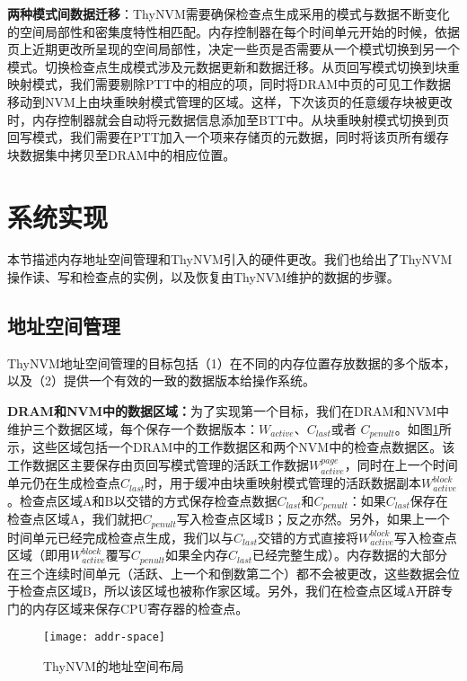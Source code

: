 \textbf{两种模式间数据迁移}：ThyNVM需要确保检查点生成采用的模式与数据不断变化的空间局部性和密集度特性相匹配。内存控制器在每个时间单元开始的时候，依据页上近期更改所呈现的空间局部性，决定一些页是否需要从一个模式切换到另一个模式。切换检查点生成模式涉及元数据更新和数据迁移。从页回写模式切换到块重映射模式，我们需要剔除PTT中的相应的项，同时将DRAM中页的可见工作数据移动到NVM上由块重映射模式管理的区域。这样，下次该页的任意缓存块被更改时，内存控制器就会自动将元数据信息添加至BTT中。从块重映射模式切换到页回写模式，我们需要在PTT加入一个项来存储页的元数据，同时将该页所有缓存块数据集中拷贝至DRAM中的相应位置。

\section{系统实现}
\label{sec:implementation}

本节描述内存地址空间管理和ThyNVM引入的硬件更改。我们也给出了ThyNVM操作读、写和检查点的实例，以及恢复由ThyNVM维护的数据的步骤。

\subsection{地址空间管理}
\label{subsec:thnvm-space}

ThyNVM地址空间管理的目标包括（1）在不同的内存位置存放数据的多个版本，以及（2）提供一个有效的一致的数据版本给操作系统。

\textbf{DRAM和NVM中的数据区域：}为了实现第一个目标，我们在DRAM和NVM中维护三个数据区域，每个保存一个数据版本：$W_{active}$、$C_{last}$或者 $C_{penult}$。如图\ref{fig-addr-space}所示，这些区域包括一个DRAM中的工作数据区和两个NVM中的检查点数据区。该工作数据区主要保存由页回写模式管理的活跃工作数据$W^{page}_{active}$，同时在上一个时间单元仍在生成检查点$C_{last}$时，用于缓冲由块重映射模式管理的活跃数据副本$W^{block}_{active}$。检查点区域A和B以交错的方式保存检查点数据$C_{last}$和$C_{penult}$：如果$C_{last}$保存在检查点区域A，我们就把$C_{penult}$写入检查点区域B；反之亦然。另外，如果上一个时间单元已经完成检查点生成，我们以与$C_{last}$交错的方式直接将$W^{block}_{active}$写入检查点区域（即用$W^{block}_{active}$覆写$C_{penult}$如果全内存$C_{last}$已经完整生成）。内存数据的大部分在三个连续时间单元（活跃、上一个和倒数第二个）都不会被更改，这些数据会位于检查点区域B，所以该区域也被称作家区域。另外，我们在检查点区域A开辟专门的内存区域来保存CPU寄存器的检查点。 

\begin{figure}[!h]
\centering
\texttt{[image: addr-space]}
\caption{ThyNVM的地址空间布局}
\label{fig-addr-space}
\end{figure}

